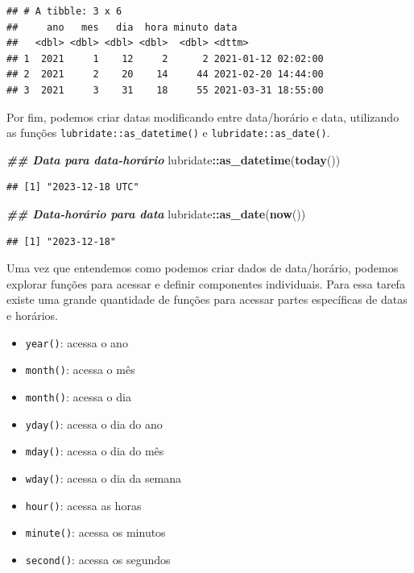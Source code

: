 \documentclass[
]{article}
\newenvironment{Shaded}{\begin{snugshade}}{\end{snugshade}}
\newcommand{\DocumentationTok}[1]{\textcolor[rgb]{0.56,0.35,0.01}{\textbf{\textit{#1}}}}
\newcommand{\FunctionTok}[1]{\textcolor[rgb]{0.13,0.29,0.53}{\textbf{#1}}}
\newcommand{\NormalTok}[1]{#1}
\newcommand{\SpecialCharTok}[1]{\textcolor[rgb]{0.81,0.36,0.00}{\textbf{#1}}}
\providecommand{\tightlist}{%
  \setlength{\itemsep}{0pt}\setlength{\parskip}{0pt}}
\begin{document}
\begin{verbatim}
## # A tibble: 3 x 6
##     ano   mes   dia  hora minuto data               
##   <dbl> <dbl> <dbl> <dbl>  <dbl> <dttm>             
## 1  2021     1    12     2      2 2021-01-12 02:02:00
## 2  2021     2    20    14     44 2021-02-20 14:44:00
## 3  2021     3    31    18     55 2021-03-31 18:55:00
\end{verbatim}

Por fim, podemos criar datas modificando entre data/horário e data, utilizando as funções \texttt{lubridate::as\_datetime()} e \texttt{lubridate::as\_date()}.

\begin{Shaded}
\begin{Highlighting}[]
\DocumentationTok{\#\# Data para data{-}horário}
\NormalTok{lubridate}\SpecialCharTok{::}\FunctionTok{as\_datetime}\NormalTok{(}\FunctionTok{today}\NormalTok{())}
\end{Highlighting}
\end{Shaded}

\begin{verbatim}
## [1] "2023-12-18 UTC"
\end{verbatim}

\begin{Shaded}
\begin{Highlighting}[]
\DocumentationTok{\#\# Data{-}horário para data}
\NormalTok{lubridate}\SpecialCharTok{::}\FunctionTok{as\_date}\NormalTok{(}\FunctionTok{now}\NormalTok{())}
\end{Highlighting}
\end{Shaded}

\begin{verbatim}
## [1] "2023-12-18"
\end{verbatim}

Uma vez que entendemos como podemos criar dados de data/horário, podemos explorar funções para acessar e definir componentes individuais. Para essa tarefa existe uma grande quantidade de funções para acessar partes específicas de datas e horários.

\begin{itemize}
\tightlist
\item
  \texttt{year()}: acessa o ano
\item
  \texttt{month()}: acessa o mês
\item
  \texttt{month()}: acessa o dia
\item
  \texttt{yday()}: acessa o dia do ano
\item
  \texttt{mday()}: acessa o dia do mês
\item
  \texttt{wday()}: acessa o dia da semana
\item
  \texttt{hour()}: acessa as horas
\item
  \texttt{minute()}: acessa os minutos
\item
  \texttt{second()}: acessa os segundos
\end{itemize}
\end{document}
